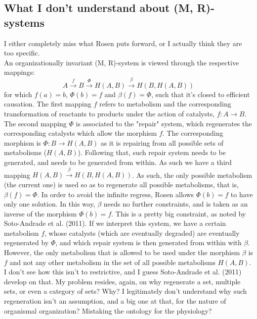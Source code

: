\documentclass[a4paper,12pt,twoside,leqno]{article}
\begin{document}
\subsection*{What I don't understand about (M, R)-systems}
I either completely miss what Rosen puts forward, or I actually think they are too specific.\\
An organizationally invariant (M, R)-system is viewed through the respective mappings:
$$
A \xrightarrow{f} B \xrightarrow{\Phi} H(A, B) \xrightarrow{\beta} H(B, H(A, B))
$$
for which $f(a) = b$, $\Phi(b) = f$ and $\beta(f) = \Phi$, such that it's closed to efficient causation. The first mapping $f$ refers to metabolism and the corresponding transformation of reactants to products under the action of catalysts, $f: A \rightarrow B$. The second mapping $\Phi$ is associated to the "repair" system, which regenerates the corresponding catalysts which allow the morphism $f$. The corresponding morphism is $\Phi: B \rightarrow H(A, B)$ as it is repairing from all possible sets of metabolisms ($H(A, B)$). Following that, such repair system needs to be generated, and needs to be generated from within. As such we have a third mapping $H(A, B) \xrightarrow{\beta} H(B, H(A, B))$. As such, the only possible metabolism (the current one) is used so as to regenerate all possible metabolisms, that is, $\beta(f) = \Phi$. In order to avoid the infinite regress, Rosen allows $\Phi(b) = f$ to have only one solution. In this way, $\beta$ needs no further constraints, and is taken as an inverse of the morphism $\Phi(b) = f$. This is a pretty big constraint, as noted by Soto-Andrade et al. (2011). If we interpret this system, we have a certain metabolism $f$, whose catalysts (which are eventually degraded) are eventually regenerated by $\Phi$, and which repair system is then generated from within with $\beta$. However, the only metabolism that is allowed to be used under the morphism $\beta$ is $f$ and not any other metabolism in the set of all possible metabolisms $H(A, B)$.\\
I don't see how this isn't to restrictive, and I guess Soto-Andrade et al. (2011) develop on that. My problem resides, again, on why regenerate a set, multiple sets, or even a category of sets? Why? I legitimately don't understand why such regeneration isn't an assumption, and a big one at that, for the nature of organismal organization? Mistaking the ontology for the physiology?
\end{document}
